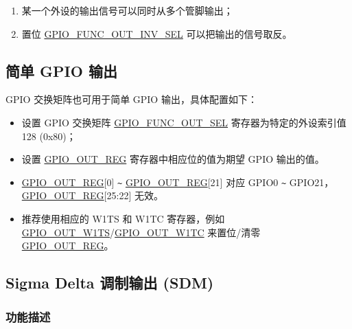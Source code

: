 \documentclass[main\_\_CN.tex]{subfiles}
\begin{document}
\begin{tiplisting}
\vspace{-2em}
\begin{enumerate}
\item \label{output-note-1} 某一个外设的输出信号可以同时从多个管脚输出；
\item \label{output-note-2} 置位 \hyperref[fielddesc:GPIOFUNCNOUTINVSEL]{GPIO\_FUNC\_OUT\_INV\_SEL} 可以把输出的信号取反。
\end{enumerate}
\end{tiplisting}

\subsection{简单 GPIO 输出}

GPIO 交换矩阵也可用于简单 GPIO 输出，具体配置如下：

\begin{itemize}
    \item 设置 GPIO 交换矩阵 \hyperref[fielddesc:GPIOFUNCNOUTSEL]{GPIO\_FUNC\_OUT\_SEL} 寄存器为特定的外设索引值 128 (0x80)；
    \item 设置 \hyperref[regdesc:GPIOOUTREG]{GPIO\_OUT\_REG} 寄存器中相应位的值为期望 GPIO 输出的值。
\end{itemize}

\begin{tiplisting}
\vspace{-2em}
\begin{itemize} 
\item \hyperref[regdesc:GPIOOUTREG]{GPIO\_OUT\_REG}[0] \verb+~+ \hyperref[regdesc:GPIOOUTREG]{GPIO\_OUT\_REG}[21] 对应 GPIO0 \verb+~+ GPIO21， \hyperref[regdesc:GPIOOUTREG]{GPIO\_OUT\_REG}[25:22] 无效。
\item 推荐使用相应的 W1TS 和 W1TC 寄存器，例如 \hyperref[fielddesc:GPIOOUTW1TS]{GPIO\_OUT\_W1TS}/\hyperref[fielddesc:GPIOOUTW1TC]{GPIO\_OUT\_W1TC} 来置位/清零 \hyperref[regdesc:GPIOOUTREG]{GPIO\_OUT\_REG}。
\end{itemize}
\end{tiplisting}

\subsection{Sigma Delta 调制输出 (SDM)}

\subsubsection{功能描述}
\end{document}

